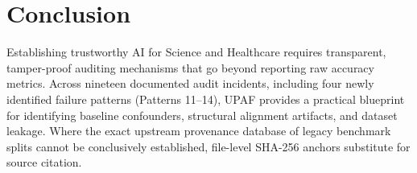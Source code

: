 \documentclass[submittal,11pt]{article}
\begin{document}
\section{Conclusion}
Establishing trustworthy AI for Science and Healthcare requires transparent, tamper-proof auditing mechanisms that go beyond reporting raw accuracy metrics. Across nineteen documented audit incidents, including four newly identified failure patterns (Patterns 11–14), UPAF provides a practical blueprint for identifying baseline confounders, structural alignment artifacts, and dataset leakage. Where the exact upstream provenance database of legacy benchmark splits cannot be conclusively established, file-level SHA-256 anchors substitute for source citation.
\end{document}

